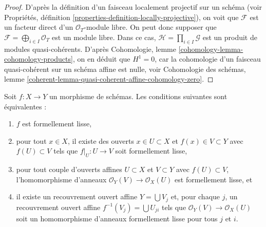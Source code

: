 \begin{proof}
D'après la définition d'un faisceau localement projectif sur un schéma (voir
Propriétés, définition \ref{properties-definition-locally-projective}),
on voit que $\mathcal{F}$ est un facteur direct d'un
$\mathcal{O}_T$-module libre. On peut donc supposer que
$\mathcal{F} = \bigoplus_{i \in I} \mathcal{O}_T$ est un module libre.
Dans ce cas, $\mathcal{H} = \prod_{i \in I} \mathcal{G}$ est
un produit de modules quasi-cohérents. D'après
Cohomologie, lemme \ref{cohomology-lemma-cohomology-products},
on en déduit que $H^1 = 0$, car la cohomologie d'un faisceau quasi-cohérent
sur un schéma affine est nulle, voir Cohomologie des schémas, lemme
\ref{coherent-lemma-quasi-coherent-affine-cohomology-zero}.
\end{proof}

\begin{lemma}
\label{lemma-formally-smooth}
Soit $f : X \to Y$ un morphisme de schémas. Les conditions suivantes sont équivalentes :
\begin{enumerate}
\item $f$ est formellement lisse,
\item pour tout $x \in X$, il existe des ouverts $x \in U \subset X$ et
$f(x) \in V \subset Y$ avec $f(U) \subset V$ tels que
$f|_U : U \to V$ soit formellement lisse,
\item pour tout couple d'ouverts affines $U \subset X$ et $V \subset Y$
avec $f(U) \subset V$, l'homomorphisme d'anneaux $\mathcal{O}_Y(V) \to \mathcal{O}_X(U)$
est formellement lisse, et
\item il existe un recouvrement ouvert affine $Y = \bigcup V_j$ et,
pour chaque $j$, un recouvrement ouvert affine $f^{-1}(V_j) = \bigcup U_{ji}$
tels que $\mathcal{O}_Y(V) \to \mathcal{O}_X(U)$ soit un homomorphisme d'anneaux
formellement lisse pour tous $j$ et $i$.
\end{enumerate}
\end{lemma}

